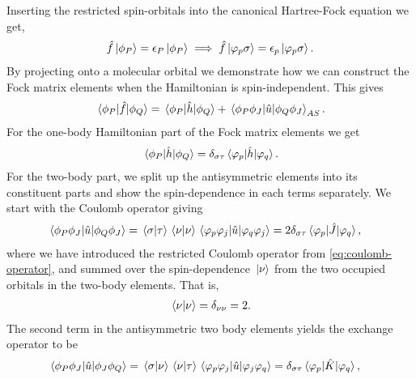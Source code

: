             Inserting the restricted spin-orbitals into the canonical
            Hartree-Fock equation we get,
            \begin{align}
                \hat{f}\ket*{\phi_P} = \epsilon_P\ket*{\phi_P}
                \implies
                \hat{f}\ket*{\varphi_p\sigma}
                = \epsilon_{p}\ket*{\varphi_p\sigma}.
            \end{align}
            By projecting onto a molecular orbital we demonstrate how we can
            construct the Fock matrix elements when the Hamiltonian is
            spin-independent.
            This gives
            \begin{align}
                \mel*{\phi_P}{\hat{f}}{\phi_Q}
                = \mel*{\phi_P}{\hat{h}}{\phi_Q}
                + \mel*{\phi_P\phi_J}{\hat{u}}{\phi_Q\phi_J}_{AS}.
                \label{eq:mo-fock-elements}
            \end{align}
            For the one-body Hamiltonian part of the Fock matrix elements we get
            \begin{align}
                \mel*{\phi_P}{\hat{h}}{\phi_Q}
                = \delta_{\sigma\tau}\mel*{\varphi_p}{\hat{h}}{\varphi_q}.
            \end{align}
            For the two-body part, we split up the antisymmetric elements into
            its constituent parts and show the spin-dependence in each terms
            separately.
            We start with the Coulomb operator giving
            \begin{align}
                \mel*{\phi_P\phi_J}{\hat{u}}{\phi_Q\phi_J}
                &= \braket*{\sigma}{\tau}\braket*{\nu}{\nu}
                \mel*{\varphi_p\varphi_j}{\hat{u}}{\varphi_q\varphi_j}
                = 2 \delta_{\sigma\tau}
                \mel*{\varphi_p}{\hat{J}}{\varphi_q},
            \end{align}
            where we have introduced the restricted Coulomb operator from
            \autoref{eq:coulomb-operator}, and summed over the spin-dependence
            $\ket*{\nu}$ from the two occupied orbitals in the two-body elements.
            That is,
            \begin{align}
                \braket*{\nu}{\nu} = \delta_{\nu\nu} = 2.
            \end{align}
            The second term in the antisymmetric two body elements yields the
            exchange operator to be
            \begin{align}
                \mel*{\phi_P\phi_J}{\hat{u}}{\phi_J\phi_Q}
                &= \braket*{\sigma}{\nu}\braket*{\nu}{\tau}
                \mel*{\varphi_p\varphi_j}{\hat{u}}{\varphi_j\varphi_q}
                = \delta_{\sigma\tau}
                \mel*{\varphi_p}{\hat{K}}{\varphi_q},
            \end{align}
